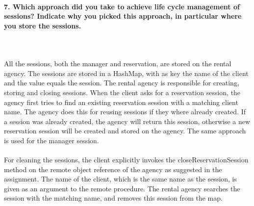 \documentclass{ds-report}
\begin{document}
	\paragraph{7. Which approach did you take to achieve life cycle management of sessions? Indicate why you picked this approach, in particular where you store the sessions.} \mbox{}\\\\
All the sessions, both the manager and reservation, are stored on the rental agency. The sessions are stored in a HashMap, with as key the name of the client and the value equals the session. The rental agency is responsible for creating, storing and closing sessions. When the client asks for a reservation session, the agency first tries to find an existing reservation session with a matching client name. The agency does this for reusing sessions if they where already created. If a session was already created, the agency will return this session, otherwise a new reservation session will be created and stored on the agency. The same approach is used for the manager session.\\\\
For cleaning the sessions, the client explicitly invokes the closeReservationSession method on the remote object reference of the agency as suggested in the assignment. The name of the client, which is the same name as the session, is given as an argument to the remote procedure. The rental agency searches the session with the matching name, and removes this session from the map.
\end{document}
